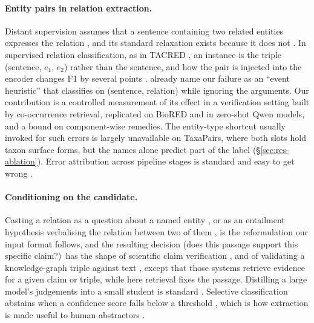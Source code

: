 \documentclass[11pt]{article}
\newcommand{\bench}{\mbox{TaxaPairs}}
\begin{document}
\paragraph{Entity pairs in relation extraction.}
Distant supervision assumes that a sentence containing two related entities expresses the relation
\citep{mintz2009distant}, and its standard relaxation exists because it does not
\citep{riedel2010modeling}. In supervised relation classification, as in TACRED \citep{zhang2017position}, an instance is the
triple (sentence, $e_1$, $e_2$) rather than the sentence, and how the pair is injected into the encoder
changes F1 by several points \citep{soares2019matching,wu2019enriching,zhou2022improved}.
\citet{rosenman2020exposing} already name our failure as an ``event heuristic'' that classifies on
(sentence, relation) while ignoring the arguments.  Our contribution is a controlled measurement of its effect in a verification setting built by co-occurrence
retrieval, replicated on BioRED and in zero-shot Qwen models,
and a bound on component-wise remedies. The entity-type shortcut usually invoked
for such errors \citep{peng2020learning,mtumbuka2024entity} is largely unavailable on \bench{}, where both slots
hold taxon surface forms, but the names alone predict part of the label (\S\ref{sec:res-ablation}). Error attribution across pipeline stages is
standard and easy to get wrong \citep{taille-etal-2020-lets,ai2023endtoend}.

\paragraph{Conditioning on the candidate.}
Casting a relation as a question about a named entity \citep{levy2017zero}, or as an entailment
hypothesis verbalising the relation between two of them \citep{obamuyide2018zero,sainz2021label},
is the reformulation our input format follows, and the resulting decision (does this passage
support this specific claim?)\ has the shape of scientific claim verification
\citep{wadden2020fact}, and of validating a knowledge-graph triple against text
\citep{lehmann2012defacto}, except that those systems retrieve evidence for a given claim or triple, while
here retrieval fixes the passage. Distilling a large model's judgements into a small student is
standard \citep{west2022symbolic,gekhman2023trueteacher}. Selective classification abstains when a confidence score falls below a
threshold \citep{geifman2017selective}, which is how extraction is made useful
to human abstractors \citep{swaminathan2024selective}.
\end{document}
